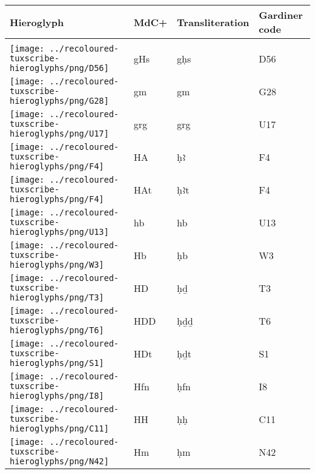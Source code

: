 \begin{center}
	\begin{tabularx}{\linewidth}{YYYY}
		Hieroglyph & MdC+ & Transliteration & Gardiner code\\
		\hline\\
		\texttt{[image: ../recoloured-tuxscribe-hieroglyphs/png/D56]} & gHs & gḥs & D56 \\ 
		\texttt{[image: ../recoloured-tuxscribe-hieroglyphs/png/G28]} & gm & gm & G28 \\ 
		\texttt{[image: ../recoloured-tuxscribe-hieroglyphs/png/U17]} & grg & grg & U17 \\ 
		\texttt{[image: ../recoloured-tuxscribe-hieroglyphs/png/F4]} & HA & ḥꜣ & F4 \\ 
		\texttt{[image: ../recoloured-tuxscribe-hieroglyphs/png/F4]} & HAt & ḥꜣt & F4 \\ 
		\texttt{[image: ../recoloured-tuxscribe-hieroglyphs/png/U13]} & hb & hb & U13 \\ 
		\texttt{[image: ../recoloured-tuxscribe-hieroglyphs/png/W3]} & Hb & ḥb & W3 \\ 
		\texttt{[image: ../recoloured-tuxscribe-hieroglyphs/png/T3]} & HD & ḥḏ & T3 \\ 
		\texttt{[image: ../recoloured-tuxscribe-hieroglyphs/png/T6]} & HDD & ḥḏḏ & T6 \\ 
		\texttt{[image: ../recoloured-tuxscribe-hieroglyphs/png/S1]} & HDt & ḥḏt & S1 \\ 
		\texttt{[image: ../recoloured-tuxscribe-hieroglyphs/png/I8]} & Hfn & ḥfn & I8 \\ 
		\texttt{[image: ../recoloured-tuxscribe-hieroglyphs/png/C11]} & HH & ḥḥ & C11 \\ 
		\texttt{[image: ../recoloured-tuxscribe-hieroglyphs/png/N42]} & Hm & ḥm & N42 \\ 
	\end{tabularx}
\end{center}


